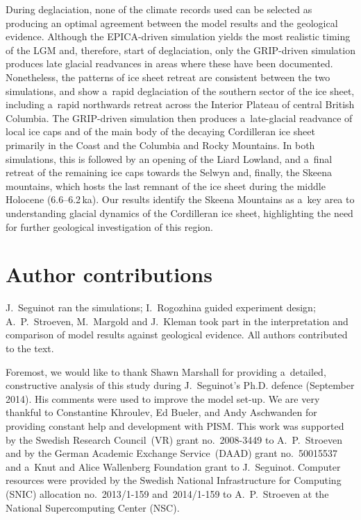 \documentclass[tc, manuscript]{copernicus}
\begin{document}
      During deglaciation, none of the climate records used can be selected
      as producing an optimal agreement between the model results and the
      geological evidence. Although the EPICA-driven simulation yields the
      most realistic timing of the LGM and, therefore, start of
      deglaciation, only the GRIP-driven simulation produces late glacial
      readvances in areas where these have been documented. Nonetheless, the
      patterns of ice sheet retreat are consistent between the two
      simulations, and show a~rapid deglaciation of the southern sector of
      the ice sheet, including a~rapid northwards retreat across the
      Interior Plateau of central British Columbia. The GRIP-driven
      simulation then produces a~late-glacial readvance of local ice caps
      and of the main body of the decaying Cordilleran ice sheet primarily
      in the Coast and the Columbia and Rocky Mountains. In both
      simulations, this is followed by an opening of the Liard Lowland, and
      a~final retreat of the remaining ice caps towards the Selwyn and,
      finally, the Skeena mountains, which hosts the last remnant of the ice
      sheet during the middle Holocene (6.6--6.2\,\unit{ka}). Our results
      identify the Skeena Mountains as a~key area to understanding glacial
      dynamics of the Cordilleran ice sheet, highlighting the need for
      further geological investigation of this region.

\section*{Author contributions}
      J.~Seguinot ran the simulations; I.~Rogozhina guided experiment
      design; A.~P.~Stroeven, M.~Margold and J.~Kleman took part in the
      interpretation and comparison of model results against geological
      evidence. All authors contributed to the text.

\begin{acknowledgements}
  Foremost, we would like to thank Shawn Marshall for providing a~detailed,
  constructive analysis of this study during J.~Seguinot's Ph.D. defence
  (September 2014). His comments were used to improve the model set-up. We
  are very thankful to Constantine Khroulev, Ed Bueler, and Andy Aschwanden
  for providing constant help and development with PISM. This work was
  supported by the Swedish Research Council~(VR) grant no.~2008-3449 to
  A.~P.~Stroeven and by the German Academic Exchange Service~(DAAD) grant
  no.~50015537 and a~Knut and Alice Wallenberg Foundation grant to
  J.~Seguinot. Computer resources were provided by the Swedish National
  Infrastructure for Computing (SNIC) allocation no.~2013/1-159
  and~2014/1-159 to A.~P.~Stroeven at the National Supercomputing Center
  (NSC).
\end{acknowledgements}
\end{document}
